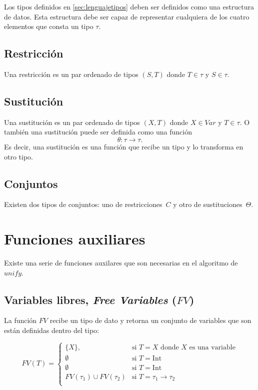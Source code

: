 \documentclass{article}
\theoremstyle{definition}
\begin{document}
Los tipos definidos en \ref{sec:lenguajetipos} deben ser definidos
como una estructura de datos. Esta estructura debe ser capaz de
representar cualquiera de los cuatro elementos que consta un tipo $\tau$.

\subsection{Restricción}
\label{sec:estrurest}

Una restricción es un par ordenado de tipos $(S,T)$ donde $T \in \tau$
y $S \in \tau$.

\subsection{Sustitución}
\label{sec:estrsust}

Una sustitución es un par ordenado de tipos $(X,T)$ donde $X \in Var$
y $T \in \tau$. O también una sustitución puede ser definida como una
función
\begin{equation*}
  \theta : \tau \to \tau.
\end{equation*}
Es decir, una sustitución es una función que recibe un tipo y lo
transforma en otro tipo.

\subsection{Conjuntos}
\label{sec:conjuntos}

Existen dos tipos de conjuntos: uno de restricciones~$C$ y otro de
sustituciones~$\Theta$.


\section{Funciones auxiliares}
\label{sec:funaux}

Existe una serie de funciones auxilares que son necesarias en el
algoritmo de $unify$.

\subsection{Variables libres, \emph{Free Variables} ($FV$) }
\label{sec:fv}

La función $FV$ recibe un tipo de dato y retorna un conjunto de
variables que son están definidas dentro del tipo:

\[
  FV(T) =
  \begin{cases}
    \{X\}, & \text{si $T = X$ donde $X$ es una variable} \\
    \emptyset & \text{si $T = \text{Int}$} \\
    \emptyset & \text{si $T = \text{Int}$} \\
    FV(\tau_1) \cup FV(\tau_2) & \text{si $T = \tau_1 \to \tau_2$} \\
  \end{cases}
\]
\end{document}
